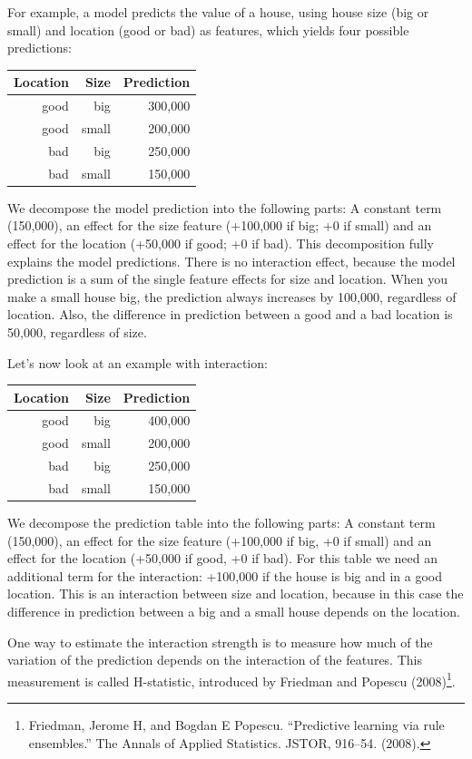 \documentclass[12pt,]{krantz}
\begin{document}
For example, a model predicts the value of a house, using house size
(big or small) and location (good or bad) as features, which yields four
possible predictions:

\begin{longtable}[]{@{}rrr@{}}
\toprule
Location & Size & Prediction\tabularnewline
\midrule
\endhead
good & big & 300,000\tabularnewline
good & small & 200,000\tabularnewline
bad & big & 250,000\tabularnewline
bad & small & 150,000\tabularnewline
\bottomrule
\end{longtable}

We decompose the model prediction into the following parts: A constant
term (150,000), an effect for the size feature (+100,000 if big; +0 if
small) and an effect for the location (+50,000 if good; +0 if bad). This
decomposition fully explains the model predictions. There is no
interaction effect, because the model prediction is a sum of the single
feature effects for size and location. When you make a small house big,
the prediction always increases by 100,000, regardless of location.
Also, the difference in prediction between a good and a bad location is
50,000, regardless of size.

Let's now look at an example with interaction:

\begin{longtable}[]{@{}rrr@{}}
\toprule
Location & Size & Prediction\tabularnewline
\midrule
\endhead
good & big & 400,000\tabularnewline
good & small & 200,000\tabularnewline
bad & big & 250,000\tabularnewline
bad & small & 150,000\tabularnewline
\bottomrule
\end{longtable}

We decompose the prediction table into the following parts: A constant
term (150,000), an effect for the size feature (+100,000 if big, +0 if
small) and an effect for the location (+50,000 if good, +0 if bad). For
this table we need an additional term for the interaction: +100,000 if
the house is big and in a good location. This is an interaction between
size and location, because in this case the difference in prediction
between a big and a small house depends on the location.

One way to estimate the interaction strength is to measure how much of
the variation of the prediction depends on the interaction of the
features. This measurement is called H-statistic, introduced by Friedman
and Popescu (2008)\footnote{Friedman, Jerome H, and Bogdan E Popescu.
  ``Predictive learning via rule ensembles.'' The Annals of Applied
  Statistics. JSTOR, 916--54. (2008).}.
\end{document}
